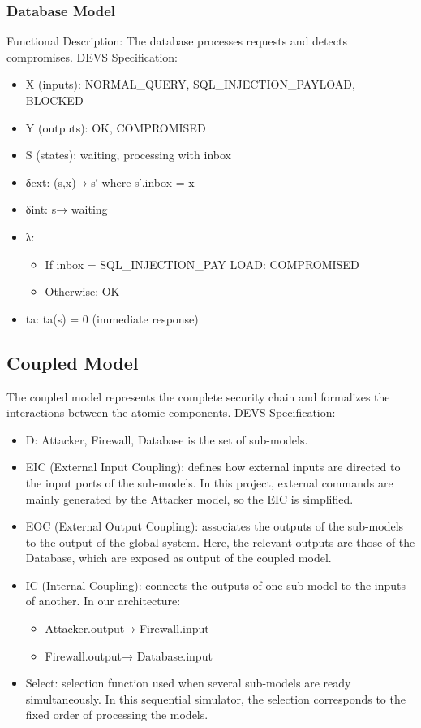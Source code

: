 \documentclass{article}
\begin{document}
\subsubsection{Database Model}
Functional Description: The database processes requests and detects compromises.
DEVS Specification:
\begin{itemize}
    \item X (inputs): {NORMAL\_QUERY, SQL\_INJECTION\_PAYLOAD, BLOCKED}
    \item Y (outputs): {OK, COMPROMISED}
    \item S (states): {waiting, processing} with inbox
    \item δext: (s,x)→ s′ where s′.inbox = x
    \item δint: s→ waiting
    \item λ:
    \begin{itemize}
        \item If inbox = SQL\_INJECTION\_PAY LOAD: COMPROMISED
        \item Otherwise: OK
    \end{itemize}
    \item ta: ta(s) = 0 (immediate response)
\end{itemize}

\subsection{Coupled Model}
The coupled model represents the complete security chain and formalizes the interactions between the atomic components.
DEVS Specification:
\begin{itemize}
    \item D: {Attacker, Firewall, Database} is the set of sub-models.
    \item EIC (External Input Coupling): defines how external inputs are directed to the input ports of the sub-models. In this project, external commands are mainly generated by the Attacker model, so the EIC is simplified.
    \item EOC (External Output Coupling): associates the outputs of the sub-models to the output of the global system. Here, the relevant outputs are those of the Database, which are exposed as output of the coupled model.
    \item IC (Internal Coupling): connects the outputs of one sub-model to the inputs of another. In our architecture:
    \begin{itemize}
        \item Attacker.output→ Firewall.input
        \item Firewall.output→ Database.input
    \end{itemize}
    \item Select: selection function used when several sub-models are ready simultaneously. In this sequential simulator, the selection corresponds to the fixed order of processing the models.
\end{itemize}
\end{document}
